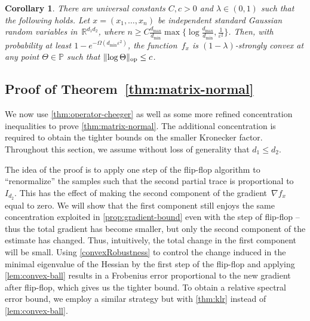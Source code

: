 \documentclass[aos]{imsart}
\newtheorem{corollary}[theorem]{Corollary}
\theoremstyle{definition}
\numberwithin{equation}{section}
\DeclareMathOperator{\op}{op}
\DeclarePairedDelimiter{\norm}{\lVert}{\rVert}
\newcommand{\R}{{\mathbb{R}}}
\renewcommand{\P}{{\mathbb{P}}}
\newcommand{\eps}{\varepsilon}
\newcommand{\samp}{x}
\def\dmax{d_{\max}}
\newcommand{\AR}[1]{{\color{orange}[AR: #1]}}
\begin{document}
\begin{corollary}\label{cor:matrix-convexity}
There are universal constants $C, c > 0$ and $\lambda\in(0,1)$ such that the following holds.
Let $x=(x_1,\dots,x_n)$ be independent standard Gaussian random variables in~$\R^{d_1d_2}$, where $n \geq C \frac{\dmax}{d_{\min}} \max\{\log \frac{\dmax}{d_{\min}}, \frac1{\eps^2} \}$.
Then, with probability at least $1 - e^{ - \Omega( d_{\min} \eps^2)}$, the function~$f_x$ is $(1-\lambda)$-strongly convex at any point $\Theta\in\P$ such that $\norm{\log\Theta}_{\op} \leq c$.
\end{corollary}



\subsection{Proof of Theorem~\ref{thm:matrix-normal}}
We now use \cref{thm:operator-cheeger} as well as some more refined concentration inequalities to prove \cref{thm:matrix-normal}.
The additional concentration is required to obtain the tighter bounds on the smaller Kronecker factor.
Throughout this section, we assume without loss of generality that $d_1 \leq d_2$. 

The idea of the proof is to apply one step of the flip-flop algorithm to ``renormalize'' the samples such that the second partial trace is proportional to $I_{d_2}$.
This has the effect of making the second component of the gradient~$\nabla f_\samp$ equal to zero.
We will show that the first component still enjoys the same concentration exploited in \cref{prop:gradient-bound} even with the step of flip-flop -- thus the total gradient has become smaller, but only the second component of the estimate has changed.
Thus, intuitively, the total change in the first component will be small.
Using \cref{convexRobustness} to control the change induced in the minimal eigenvalue of the Hessian by the first step of the flip-flop and applying \cref{lem:convex-ball} results in a Frobenius error proportional to the new gradient after flip-flop, which gives us the tighter bound.
To obtain a relative spectral error bound, we employ a similar strategy but with \cref{thm:klr} instead of \cref{lem:convex-ball}.
\end{document}
